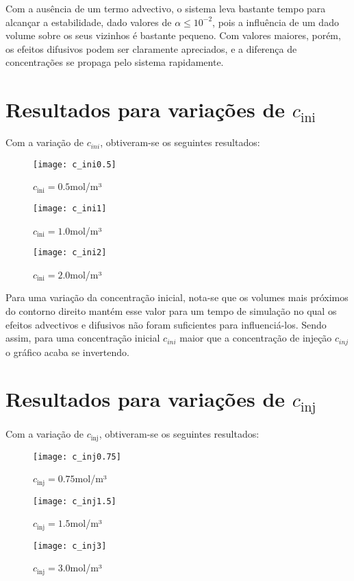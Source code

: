 Com a ausência de um termo advectivo, o sistema leva bastante tempo para
alcançar a estabilidade, dado valores de $\alpha \leq 10^{-2}$, pois a
influência de um dado volume sobre os seus vizinhos é bastante pequeno. Com
valores maiores, porém, os efeitos difusivos podem ser claramente apreciados, e
a diferença de concentrações se propaga pelo sistema rapidamente.

\section{Resultados para variações de $c_\text{ini}$}
Com a variação de $c_{ini}$, obtiveram-se os seguintes resultados:
\begin{figure}[H]
    \centering
    \texttt{[image: c\_ini0.5]}
    \caption{$c_\text{ini} = 0.5$mol/m³}
\end{figure}
\begin{figure}[H]
    \centering
    \texttt{[image: c\_ini1]}
    \caption{$c_\text{ini} = 1.0$mol/m³}
\end{figure}
\begin{figure}[H]
    \centering
    \texttt{[image: c\_ini2]}
    \caption{$c_\text{ini} = 2.0$mol/m³}
\end{figure}

Para uma variação da concentração inicial, nota-se que os volumes mais
próximos do contorno direito mantém esse valor para um tempo de simulação no
qual os efeitos advectivos e difusivos não foram suficientes para
influenciá-los. Sendo assim, para uma concentração inicial $c_{ini}$ maior que
a concentração de injeção $c_{inj}$ o gráfico acaba se invertendo.

\section{Resultados para variações de $c_\text{inj}$}
Com a variação de $c_\text{inj}$, obtiveram-se os seguintes resultados:
\begin{figure}[H]
    \centering
    \texttt{[image: c\_inj0.75]}
    \caption{$c_\text{inj} = 0.75$mol/m³}
\end{figure}
\begin{figure}[H]
    \centering
    \texttt{[image: c\_inj1.5]}
    \caption{$c_\text{inj} = 1.5$mol/m³}
\end{figure}
\begin{figure}[H]
    \centering
    \texttt{[image: c\_inj3]}
    \caption{$c_\text{inj} = 3.0$mol/m³}
\end{figure}

